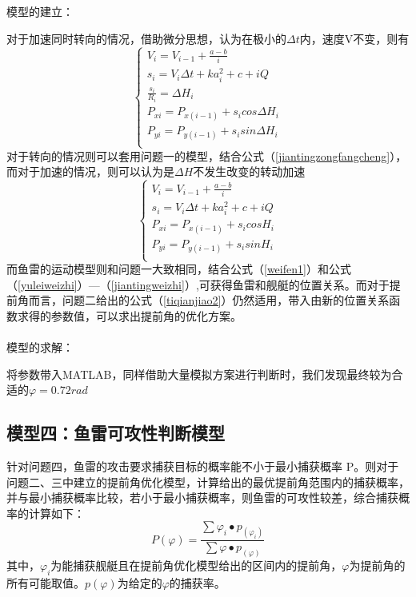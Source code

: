 \documentclass[12pt]{article}%
\begin{document}
模型的建立：

对于加速同时转向的情况，借助微分思想，认为在极小的$\Delta t$内，速度V不变，则有
\begin{equation}\label{weifen1}
\left\{ 
\begin{array}{c}
V_i=V_{i-1}+\frac{a-b}{i}\\
s_i=V_{i}\Delta t+ka_i^2+c+iQ \\
\frac{s_i}{R_i}=\Delta H_i\\
P_{xi}=P_{x(i-1)}+s_icos\Delta H_i\\
P_{yi}=P_{y(i-1)}+s_isin\Delta H_i\\
\end{array} \right.  
\end{equation}
对于转向的情况则可以套用问题一的模型，结合公式（\ref{jiantingzongfangcheng}），而对于加速的情况，则可以认为是$\Delta H$不发生改变的转动加速
\begin{equation}\label{weifen2}
\left\{ 
\begin{array}{c}
V_i=V_{i-1}+\frac{a-b}{i}\\
s_i=V_{i}\Delta t+ka_i^2+c+iQ \\
P_{xi}=P_{x(i-1)}+s_icosH_i\\
P_{yi}=P_{y(i-1)}+s_isinH_i\\
\end{array} \right.  
\end{equation}
而鱼雷的运动模型则和问题一大致相同，结合公式（\ref{weifen1}）和公式（\ref{yuleiweizhi}）—（\ref{jiantingweizhi}）,可获得鱼雷和舰艇的位置关系。而对于提前角而言，问题二给出的公式（\ref{tiqianjiao2}）仍然适用，带入由新的位置关系函数求得的参数值，可以求出提前角的优化方案。\\\ \\
模型的求解：\par
将参数带入MATLAB，同样借助大量模拟方案进行判断时，我们发现最终较为合适的$\varphi=0.72rad$
\subsection{模型四：鱼雷可攻性判断模型}
针对问题四，鱼雷的攻击要求捕获目标的概率能不小于最小捕获概率 P。则对于问题二、三中建立的提前角优化模型，计算给出的最优提前角范围内的捕获概率，并与最小捕获概率比较，若小于最小捕获概率，则鱼雷的可攻性较差，综合捕获概率的计算如下：
\begin{equation}\label{tiqianjiao2}
P(\varphi)=\frac{\sum \varphi_i\bullet p_(\varphi_i)}{\sum \varphi\bullet p_(\varphi)}
\end{equation}
其中，$\varphi_i$为能捕获舰艇且在提前角优化模型给出的区间内的提前角，$\varphi$为提前角的所有可能取值。$p(\varphi)$为给定的$\varphi$的捕获率。
\end{document}

